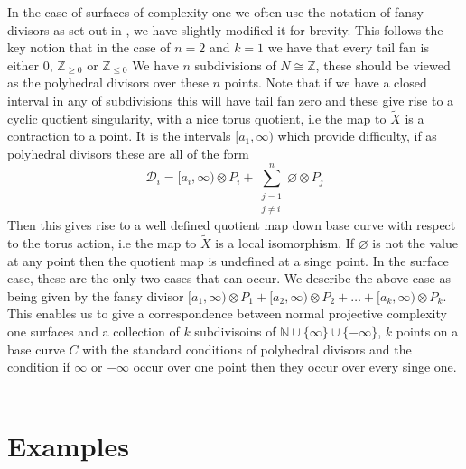 \documentclass[12pt,a4paper]{book}      %
\theoremstyle{definition}
\newcommand{\mb}[1]{\mathbb{#1}}
\newcommand{\wt}[1]{\widetilde #1}
\begin{document}
In the case of surfaces of complexity one we often use the notation of fansy divisors as set out in \cite{Suss}, we have slightly modified it for brevity. This follows the key notion that in the case of $n=2$ and $k=1$ we have that every tail fan is either $0$, $\mathbb{Z}_{\geq 0 }$ or $\mathbb{Z}_{\leq 0}$ We have $n$ subdivisions of $N \cong \mathbb{Z}$, these should be viewed as the polyhedral divisors over these $n$ points. Note that if we have a closed interval in any of subdivisions this will have tail fan zero and these give rise to a cyclic quotient singularity, with a nice torus quotient, i.e the map to $\wt{X}$ is a contraction to a point. It is the intervals $[a_1, \infty )$ which provide difficulty, if as polyhedral divisors these are all of the form 
\[
\mathcal{D}_i = [a_i, \infty) \otimes P_i + \sum_{\substack{j = 1 \\ j \neq i}}^n \varnothing \otimes P_j
\]
Then this gives rise to a well defined quotient map down base curve with respect to the torus action, i.e  the map to $\wt{X}$ is a local isomorphism. If $\varnothing$ is not the value at any point then the quotient map is undefined at a singe point. In the surface case, these are the only two cases that can occur. We describe the above case as being given by the fansy divisor $[a_1, \infty) \otimes P_1 + [a_2, \infty) \otimes P_2 + \dots + [a_k, \infty) \otimes P_k$. This enables us to give a correspondence between normal projective complexity one surfaces and a collection of $k$ subdivisoins of $\mb{N}\cup \{ \infty \} \cup \{-\infty \}$, $k$ points on a base curve $C$ with the standard conditions of polyhedral divisors and the condition if $\infty$ or $-\infty$ occur over one point then they occur over every singe one. 
\\
\\
\section{Examples}
\end{document}

